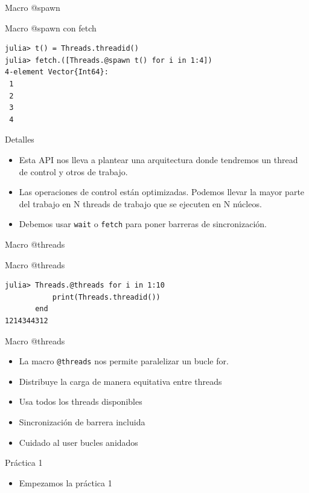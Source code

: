 \documentclass[bigger]{beamer}
\begin{document}
\begin{frame}[label={sec:org4b6445b},fragile]{Macro @spawn}
 \begin{block}{Macro @spawn con fetch}
\begin{verbatim}
julia> t() = Threads.threadid()
julia> fetch.([Threads.@spawn t() for i in 1:4])
4-element Vector{Int64}:
 1
 2
 3
 4
\end{verbatim}
\end{block}
\end{frame}

\begin{frame}[label={sec:org98c6502},fragile]{Detalles}
 \begin{itemize}
\item Esta API nos lleva a plantear una arquitectura donde tendremos un thread de \alert{control} y otros de \alert{trabajo}.
\item Las operaciones de control están optimizadas. Podemos llevar la mayor parte del trabajo en N threads de trabajo que se ejecuten en N núcleos.
\item Debemos usar \texttt{wait} o \texttt{fetch} para poner barreras de sincronización.
\end{itemize}
\end{frame}

\begin{frame}[label={sec:orgda62f60},fragile]{Macro @threads}
 \begin{block}{Macro @threads}
\begin{verbatim}
julia> Threads.@threads for i in 1:10
           print(Threads.threadid())
       end
1214344312
\end{verbatim}
\end{block}
\end{frame}

\begin{frame}[label={sec:orgd78ea4b},fragile]{Macro @threads}
 \begin{itemize}
\item La macro \texttt{@threads} nos permite paralelizar un bucle for.
\item Distribuye la carga de manera equitativa entre threads
\item Usa todos los threads disponibles
\item Sincronización de barrera incluida
\item Cuidado al user bucles anidados
\end{itemize}
\end{frame}

\begin{frame}[label={sec:org4c4115c}]{Práctica 1}
\begin{itemize}
\item Empezamos la práctica 1
\end{itemize}
\end{frame}
\end{document}
